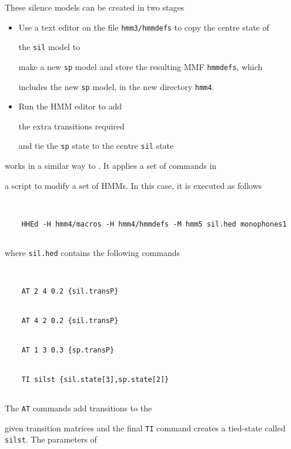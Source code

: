 These silence models can be created in two stages


\begin{itemize}


\item 


Use a text editor on the file \texttt{hmm3/hmmdefs} to copy the centre state of


the \texttt{sil} model to


make a new \texttt{sp} model and store the resulting MMF \texttt{hmmdefs}, which 


includes the new \texttt{sp} model, in the new directory \texttt{hmm4}. 





\item Run the HMM editor  to add 


the extra transitions required


and tie the \texttt{sp} state to the centre \texttt{sil} state


\end{itemize}





 works in a similar way to .  It applies a set of commands in


a script to modify a set of HMMs.  In this case, it is executed as follows


\begin{verbatim}


    HHEd -H hmm4/macros -H hmm4/hmmdefs -M hmm5 sil.hed monophones1


\end{verbatim}


where \texttt{sil.hed} contains the following commands


\begin{verbatim}


    AT 2 4 0.2 {sil.transP}


    AT 4 2 0.2 {sil.transP}


    AT 1 3 0.3 {sp.transP}


    TI silst {sil.state[3],sp.state[2]}


\end{verbatim}


The \texttt{AT} commands add transitions to the


given transition matrices and the final \texttt{TI} command creates a tied-state called \texttt{silst}.  The parameters of


